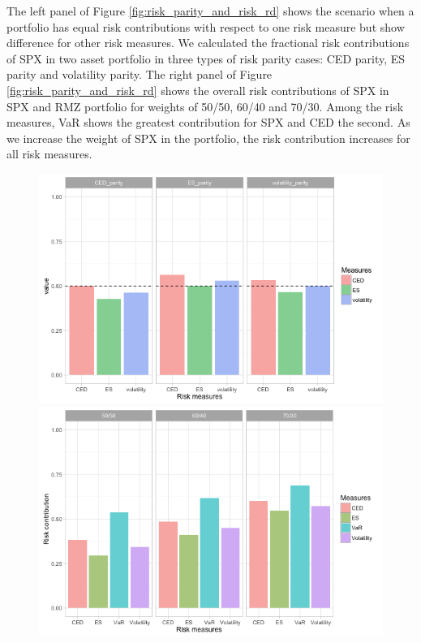 \documentclass[11pt]{article}
\begin{document}
The left panel of Figure \ref{fig:risk_parity_and_risk_rd} shows the scenario when a portfolio has equal risk contributions with respect to one risk measure but show difference for other risk measures. We calculated the fractional risk contributions of SPX in two asset portfolio in three types of risk parity cases: CED parity, ES parity and volatility parity. The right panel of Figure \ref{fig:risk_parity_and_risk_rd} shows the overall risk contributions of SPX in SPX and RMZ portfolio for weights of 50/50, 60/40 and 70/30. Among the risk measures, VaR shows the greatest contribution for SPX and CED the second. As we increase the weight of SPX in the portfolio, the risk contribution increases for all risk measures. 

\begin{figure}[H]
  \centering
  \begin{minipage}[b]{0.48\textwidth}
    \includegraphics[width = 1\textwidth]{../figures/risk_contribution/risk_parity}
  \end{minipage}
  \hfill
  \begin{minipage}[b]{0.48\textwidth}
    \includegraphics[width = 1\textwidth]{../figures/risk_contribution/overall_rc}

\end{minipage}
\end{figure}
\end{document}
